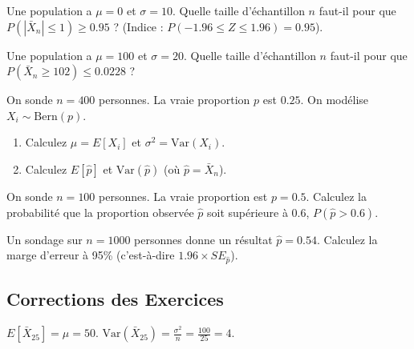 \begin{exercicebox}
Une population a $\mu=0$ et $\sigma=10$.
Quelle taille d'échantillon $n$ faut-il pour que $P(|\bar{X}_n| \le 1) \ge 0.95$ ?
(Indice : $P(-1.96 \le Z \le 1.96) = 0.95$).
\end{exercicebox}

\begin{exercicebox}
Une population a $\mu=100$ et $\sigma=20$.
Quelle taille d'échantillon $n$ faut-il pour que $P(\bar{X}_n \ge 102) \le 0.0228$ ?
\end{exercicebox}


\begin{exercicebox}
On sonde $n=400$ personnes. La vraie proportion $p$ est $0.25$. On modélise $X_i \sim \text{Bern}(p)$.
\begin{enumerate}
    \item Calculez $\mu = E[X_i]$ et $\sigma^2 = \text{Var}(X_i)$.
    \item Calculez $E[\hat{p}]$ et $\text{Var}(\hat{p})$ (où $\hat{p} = \bar{X}_n$).
\end{enumerate}
\end{exercicebox}

\begin{exercicebox}
On sonde $n=100$ personnes. La vraie proportion est $p=0.5$.
Calculez la probabilité que la proportion observée $\hat{p}$ soit supérieure à 0.6, $P(\hat{p} > 0.6)$.
\end{exercicebox}

\begin{exercicebox}
Un sondage sur $n=1000$ personnes donne un résultat $\hat{p} = 0.54$.
Calculez la marge d'erreur à 95\% (c'est-à-dire $1.96 \times SE_{\hat{p}}$).
\end{exercicebox}


\subsection{Corrections des Exercices}

\begin{correctionbox}
$E[\bar{X}_{25}] = \mu = 50$.
$\text{Var}(\bar{X}_{25}) = \frac{\sigma^2}{n} = \frac{100}{25} = 4$.
\end{correctionbox}

